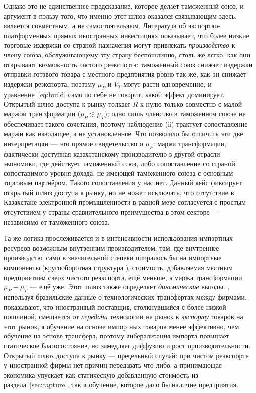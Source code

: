 \documentclass[12pt]{article}
\begin{document}
Однако это не единственное предсказание, которое делает таможенный союз, и аргумент в
пользу того, что именно этот шлюз оказался связывающим здесь, является совместным, а не
самостоятельным. Литература об экспортно-платформенных прямых иностранных инвестициях
\citep{brainard1997,helpmanmelitzyeaple2004,ekholmforslidmarkusen2007} показывает, что более
низкие торговые издержки со страной назначения могут привлекать \emph{производство} к
члену союза, обслуживающему эту страну беспошлинно, столь же легко, как они открывают
возможность чистого реэкспорта: таможенный союз снижает издержки отправки готового товара с
местного предприятия ровно так же, как он снижает издержки реэкспорта, поэтому $\mu_P$ и
$V_T$ могут расти одновременно, и уравнение~\eqref{eq:build} само по себе не говорит, какой
эффект доминирует. Открытый шлюз доступа к рынку толкает $R$ к нулю только совместно с малой
маржой трансформации ($\mu_P \lesssim \mu_T$); одно лишь членство в таможенном союзе не
обеспечивает такого сочетания, поэтому наблюдение (ii) трактует сопоставление маржи как
наводящее, а не установленное. Что позволило бы отличить эти две интерпретации — это прямое
свидетельство о $\mu_P$: маржа трансформации, фактически доступная казахстанскому
производителю в другой отрасли экономики, где действует таможенный союз, либо сопоставление
со страной сопоставимого уровня дохода, не имеющей таможенного союза с основным торговым
партнёром. Такого сопоставления у нас нет. Данный кейс фиксирует открытый шлюз доступа к
рынку, но не может исключить, что отсутствие в Казахстане электронной промышленности в
равной мере согласуется с простым отсутствием у страны сравнительного преимущества в этом
секторе — независимо от таможенного союза.

Та же логика прослеживается и в интенсивности использования импортных ресурсов возможным
внутренним производителем: там, где внутреннее производство само в значительной степени
опиралось бы на импортные компоненты (кругооборотная структура
\citet{gopinathneiman2014}), стоимость, добавляемая местным предприятием сверх чистого
реэкспорта, ещё меньше, а маржа трансформации $\mu_P - \mu_T$ — ещё уже. Этот шлюз также
определяет \emph{динамические} выгоды. \citet{desouza2024diffusion}, используя бразильские
данные о технологических трансфертах между фирмами, показывают, что иностранный поставщик,
столкнувшийся с более низкой пошлиной, смещается от \emph{передачи} технологии на рынок к
\emph{экспорту} товаров на этот рынок, а обучение на основе импортных товаров менее
эффективно, чем обучение на основе трансфера, поэтому либерализация импорта повышает
статическое благосостояние, но замедляет диффузию и рост производительности. Открытый шлюз
доступа к рынку — предельный случай: при чистом реэкспорте у иностранной фирмы нет причин
передавать что-либо, а принимающая экономика упускает как статическую добавленную стоимость
из раздела~\ref{sec:capture}, так и обучение, которое дало бы наличие предприятия.
\end{document}
